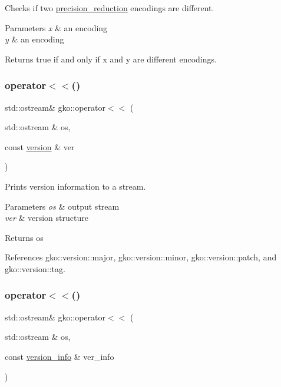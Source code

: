 Checks if two \hyperlink{classgko_1_1precision__reduction}{precision\+\_\+reduction} encodings are different. 


\begin{DoxyParams}{Parameters}
{\em x} & an encoding \\
\hline
{\em y} & an encoding\\
\hline
\end{DoxyParams}
\begin{DoxyReturn}{Returns}
true if and only if {\ttfamily x} and {\ttfamily y} are different encodings. 
\end{DoxyReturn}
\mbox{\label{namespacegko_ae0ef652f487afe43aebcf778038ff780}} 
\subsubsection{\texorpdfstring{operator$<$$<$()}{operator<<()}\hspace{0.1cm}{\footnotesize\ttfamily [1/2]}}
{\footnotesize\ttfamily std\+::ostream\& gko\+::operator$<$$<$ (\begin{DoxyParamCaption}\item[{std\+::ostream \&}]{os,  }\item[{const \hyperlink{structgko_1_1version}{version} \&}]{ver }\end{DoxyParamCaption})\hspace{0.3cm}{\ttfamily [inline]}}



Prints version information to a stream. 


\begin{DoxyParams}{Parameters}
{\em os} & output stream \\
\hline
{\em ver} & version structure\\
\hline
\end{DoxyParams}
\begin{DoxyReturn}{Returns}
os 
\end{DoxyReturn}


References gko\+::version\+::major, gko\+::version\+::minor, gko\+::version\+::patch, and gko\+::version\+::tag.

\mbox{\label{namespacegko_ad9e3ba96a10fe47a03ceef39b45bd43c}} 
\subsubsection{\texorpdfstring{operator$<$$<$()}{operator<<()}\hspace{0.1cm}{\footnotesize\ttfamily [2/2]}}
{\footnotesize\ttfamily std\+::ostream\& gko\+::operator$<$$<$ (\begin{DoxyParamCaption}\item[{std\+::ostream \&}]{os,  }\item[{const \hyperlink{classgko_1_1version__info}{version\+\_\+info} \&}]{ver\+\_\+info }\end{DoxyParamCaption})}



